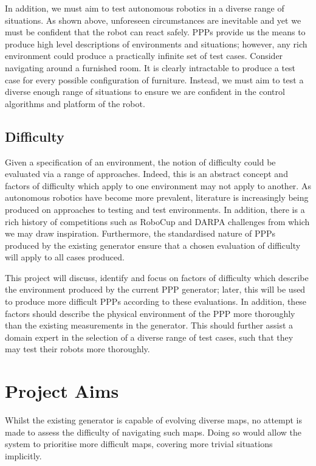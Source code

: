 \documentclass[authoryearcitations]{UoYCSproject}
\begin{document}
In addition, we must aim to test autonomous robotics in a diverse range of situations. As shown above, unforeseen circumstances are inevitable and yet we must be confident that the robot can react safely. PPPs provide us the means to produce high level descriptions of environments and situations; however, any rich environment could produce a practically infinite set of test cases. Consider navigating around a furnished room. It is clearly intractable to produce a test case for every possible configuration of furniture. Instead, we must aim to test a diverse enough range of situations to ensure we are confident in the control algorithms and platform of the robot.

\subsection{Difficulty}
\label{sec:motivation_difficulty}
Given a specification of an environment, the notion of difficulty could be evaluated via a range of approaches. Indeed, this is an abstract concept and factors of difficulty which apply to one environment may not apply to another. As autonomous robotics have become more prevalent, literature is increasingly being produced on approaches to testing and test environments. In addition, there is a rich history of competitions such as RoboCup and DARPA challenges from which we may draw inspiration. Furthermore, the standardised nature of PPPs produced by the existing generator ensure that a chosen evaluation of difficulty will apply to all cases produced.

This project will discuss, identify and focus on factors of difficulty which describe the environment produced by the current PPP generator; later, this will be used to produce more difficult PPPs according to these evaluations. In addition, these factors should describe the physical environment of the PPP more thoroughly than the existing measurements in the generator. This should further assist a domain expert in the selection of a diverse range of test cases, such that they may test their robots more thoroughly.

\section{Project Aims}
\label{sec:ProjectAims}
Whilst the existing generator is capable of evolving diverse maps, no attempt is made to assess the difficulty of navigating such maps. Doing so would allow the system to prioritise more difficult maps, covering more trivial situations implicitly.
\end{document}
